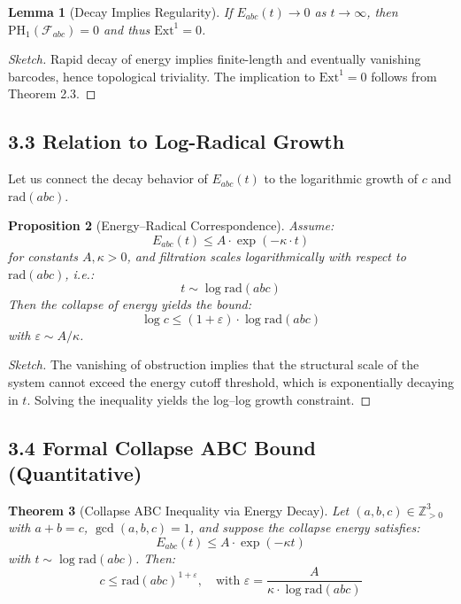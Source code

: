 \documentclass[11pt]{article}
\newtheorem{theorem}{Theorem}[section]
\newtheorem{proposition}[theorem]{Proposition}
\newtheorem{lemma}[theorem]{Lemma}
\begin{document}
\begin{lemma}[Decay Implies Regularity]
If \( E_{abc}(t) \to 0 \) as \( t \to \infty \), then \( \mathrm{PH}_1(\mathcal{F}_{abc}) = 0 \) and thus \( \mathrm{Ext}^1 = 0 \).
\end{lemma}

\begin{proof}[Sketch]
Rapid decay of energy implies finite-length and eventually vanishing barcodes, hence topological triviality. The implication to \( \mathrm{Ext}^1 = 0 \) follows from Theorem 2.3.
\end{proof}

\subsection{3.3 Relation to Log-Radical Growth}

Let us connect the decay behavior of \( E_{abc}(t) \) to the logarithmic growth of \( c \) and \( \mathrm{rad}(abc) \).

\begin{proposition}[Energy–Radical Correspondence]
Assume:
\[
E_{abc}(t) \leq A \cdot \exp\left( -\kappa \cdot t \right)
\]
for constants \( A, \kappa > 0 \), and filtration scales logarithmically with respect to \( \mathrm{rad}(abc) \), i.e.:
\[
t \sim \log \mathrm{rad}(abc)
\]
Then the collapse of energy yields the bound:
\[
\log c \leq (1 + \varepsilon) \cdot \log \mathrm{rad}(abc)
\]
with \( \varepsilon \sim A / \kappa \).
\end{proposition}

\begin{proof}[Sketch]
The vanishing of obstruction implies that the structural scale of the system cannot exceed the energy cutoff threshold, which is exponentially decaying in \( t \). Solving the inequality yields the log–log growth constraint.
\end{proof}

\subsection{3.4 Formal Collapse ABC Bound (Quantitative)}

\begin{theorem}[Collapse ABC Inequality via Energy Decay]
Let \( (a, b, c) \in \mathbb{Z}_{>0}^3 \) with \( a + b = c \), \( \gcd(a,b,c) = 1 \), and suppose the collapse energy satisfies:
\[
E_{abc}(t) \leq A \cdot \exp(-\kappa t)
\]
with \( t \sim \log \mathrm{rad}(abc) \). Then:
\[
c \leq \mathrm{rad}(abc)^{1 + \varepsilon}, \quad \text{with } \varepsilon = \frac{A}{\kappa \cdot \log \mathrm{rad}(abc)}
\]
\end{theorem}
\end{document}

